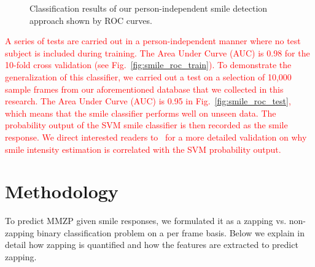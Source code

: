 \documentclass[twoside,leqno,twocolumn]{article}
\newcommand{\Songfan}[1]{\textcolor{red}{#1}}
\begin{document}
\begin{figure}[htbp]
\centering

\caption{Classification results of our person-independent smile detection approach shown by ROC curves.}
\end{figure}


\Songfan{A series of tests are carried out in a person-independent manner where no test subject is included during training. The Area Under Curve (AUC) is 0.98 for the 10-fold cross validation (see Fig.~\ref{fig:smile_roc_train}). To demonstrate the generalization of this classifier, we carried out a test on a selection of 10,000 sample frames from our aforementioned database that we collected in this research. The Area Under Curve (AUC) is 0.95 in Fig.~\ref{fig:smile_roc_test}, which means that the smile classifier performs well on unseen data. The probability output of the SVM smile classifier is then recorded as the smile response. We direct interested readers to~\cite{Yang_TAC14} for a more detailed validation on why smile intensity estimation is correlated with the SVM probability output.}


\section{Methodology}%
To predict MMZP given smile responses, we formulated it as a zapping vs. non-zapping binary classification problem on a per frame basis. Below we explain in detail how zapping is quantified and how the features are extracted to predict zapping.
\end{document}
